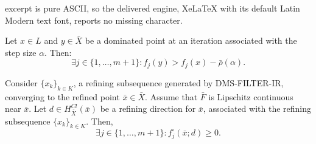 \documentclass[10pt,a4paper]{amsart}
\newcommand{\set}[1]{\{#1\}}
\begin{document}
excerpt is pure ASCII, so the delivered engine, XeLaTeX with its default Latin Modern text font, reports no missing character.
\begin{proposition}\label{prop_dominance}
Let $x\in L$ and $y\in \bar{X}$ be a dominated point at an
iteration associated with the step size $\alpha$. Then:
$$\exists j\in\{1,\ldots,m+1\}:f_j(y)>f_j(x)-\bar{\rho}(\alpha).$$
\end{proposition}

\begin{theorem}
\label{teo_opt_f} Consider $\{x_k\}_{k\in K}$, a refining
subsequence generated by DMS-FILTER-IR, converging to the refined
point $\bar{x}\in \bar{X}$. Assume that $\bar{F}$ is Lipschitz
continuous near $\bar{x}$. Let $d\in H^{Cl}_{\bar{X}}(\bar{x})$ be
a refining direction for $\bar{x}$, associated with the refining
subsequence $\{x_k\}_{k\in K}$. Then,
$$\exists j\in\set{1,\ldots,m+1}: f_j^\circ(\bar{x};d)\geq
0.$$
\end{theorem}
\end{document}
